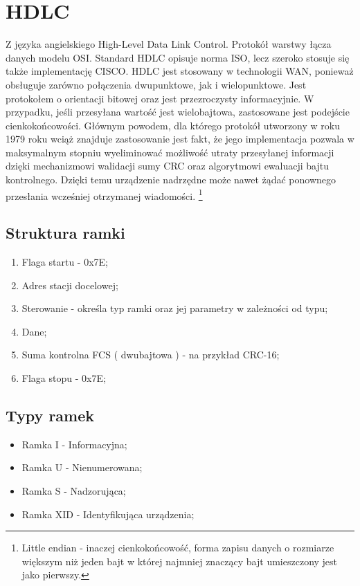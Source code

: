 \section{HDLC}
Z języka angielskiego High-Level Data Link Control. Protokół warstwy łącza danych modelu OSI. 
Standard HDLC opisuje norma ISO, lecz szeroko stosuje się także implementację CISCO.
HDLC jest stosowany w technologii WAN, ponieważ obsługuje zarówno połączenia dwupunktowe, jak i wielopunktowe. 
Jest protokołem o orientacji bitowej oraz jest przezroczysty informacyjnie. \autocite{WIKI_HDLC}
W przypadku, jeśli przesyłana wartość jest wielobajtowa, zastosowane jest podejście cienkokońcowości.
Głównym powodem, dla którego protokół utworzony w roku 1979 roku wciąż znajduje zastosowanie jest fakt, że jego implementacja pozwala w maksymalnym stopniu
wyeliminować możliwość utraty przesyłanej informacji dzięki mechanizmowi walidacji sumy CRC oraz algorytmowi ewaluacji bajtu kontrolnego. Dzięki temu urządzenie nadrzędne może nawet żądać
ponownego przesłania wcześniej otrzymanej wiadomości.
\footnote{\label{Little endian} Little endian - inaczej cienkokońcowość, forma zapisu danych o rozmiarze większym niż jeden bajt w której najmniej znaczący bajt umieszczony jest jako pierwszy.}
\subsection{Struktura ramki}
\begin{enumerate}
    \item Flaga startu - 0x7E;
    \item Adres stacji docelowej;
    \item Sterowanie - określa typ ramki oraz jej parametry w zależności od typu;
    \item Dane;
    \item Suma kontrolna FCS ( dwubajtowa ) - na przykład CRC-16;
    \item Flaga stopu - 0x7E;
\end{enumerate}
\subsection{Typy ramek}
\begin{itemize}
    \item Ramka I - Informacyjna;
    \item Ramka U - Nienumerowana;
    \item Ramka S - Nadzorująca;
    \item Ramka XID - Identyfikująca urządzenia;
\end{itemize}
